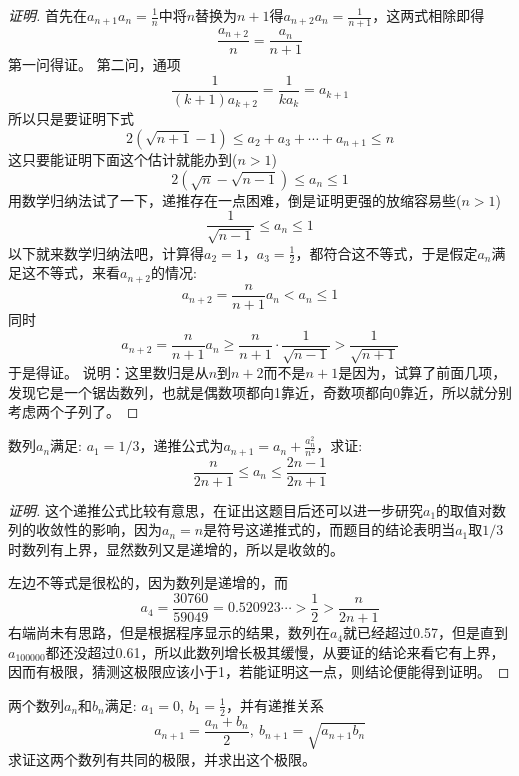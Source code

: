 \exerciseFrom[\url{http://kuing.orzweb.net/viewthread.php?tid=4554}]

\exerciseSolvedDate[2017-04-21]

\begin{proof}[证明]
  首先在$a_{n+1}a_n=\frac{1}{n}$中将$n$替换为$n+1$得$a_{n+2}a_{n}=\frac{1}{n+1}$，这两式相除即得
\[ \frac{a_{n+2}}{n} = \frac{a_n}{n+1} \]
第一问得证。
第二问，通项
\[ \frac{1}{(k+1)a_{k+2}} = \frac{1}{ka_k} = a_{k+1} \]
所以只是要证明下式
\[ 2(\sqrt{n+1}-1) \leqslant a_2+a_3+\cdots+a_{n+1} \leqslant n \]
这只要能证明下面这个估计就能办到($n>1$)
\[ 2(\sqrt{n}-\sqrt{n-1}) \leqslant a_n \leqslant 1 \]
用数学归纳法试了一下，递推存在一点困难，倒是证明更强的放缩容易些($n>1$)
\[ \frac{1}{\sqrt{n-1}} \leqslant a_n \leqslant 1 \]
以下就来数学归纳法吧，计算得$a_2=1$，$a_3=\frac{1}{2}$，都符合这不等式，于是假定$a_n$满足这不等式，来看$a_{n+2}$的情况:
\[ a_{n+2} = \frac{n}{n+1}a_n < a_n \leqslant 1 \]
同时
\[ a_{n+2} = \frac{n}{n+1}a_n \geqslant \frac{n}{n+1} \cdot \frac{1}{\sqrt{n-1}} > \frac{1}{\sqrt{n+1}} \]
于是得证。
说明：这里数归是从$n$到$n+2$而不是$n+1$是因为，试算了前面几项，发现它是一个锯齿数列，也就是偶数项都向1靠近，奇数项都向0靠近，所以就分别考虑两个子列了。
\end{proof}

\begin{exercise}
  数列$a_n$满足: $a_1=1/3$，递推公式为$a_{n+1}=a_n+\frac{a_n^2}{n^2}$，求证:
  \[ \frac{n}{2n+1} \leqslant a_n \leqslant \frac{2n-1}{2n+1} \]
\end{exercise}

\begin{proof}[证明]
  这个递推公式比较有意思，在证出这题目后还可以进一步研究$a_1$的取值对数列的收敛性的影响，因为$a_n=n$是符号这递推式的，而题目的结论表明当$a_1$取$1/3$时数列有上界，显然数列又是递增的，所以是收敛的。

  左边不等式是很松的，因为数列是递增的，而
  \[ a_4=\frac{30760}{59049}=0.520923\cdots>\frac{1}{2}>\frac{n}{2n+1} \]
  右端尚未有思路，但是根据程序显示的结果，数列在$a_4$就已经超过0.57，但是直到$a_{100000}$都还没超过0.61，所以此数列增长极其缓慢，从要证的结论来看它有上界，因而有极限，猜测这极限应该小于1，若能证明这一点，则结论便能得到证明。
\end{proof}

\begin{exercise} 
  两个数列$a_n$和$b_n$满足: $a_1=0$, $b_1=\frac{1}{2}$，并有递推关系
  \[ a_{n+1}=\frac{a_n+b_n}{2}, \  b_{n+1}=\sqrt{a_{n+1}b_n} \]
  求证这两个数列有共同的极限，并求出这个极限。
\end{exercise}

